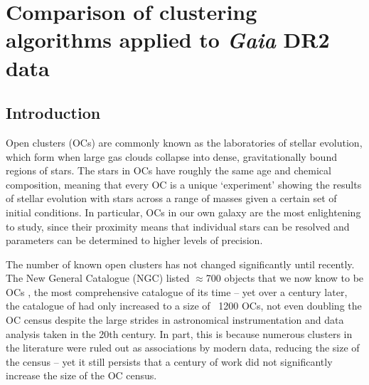 %
\chapter{Comparison of clustering algorithms applied to \emph{Gaia} DR2 data}
\label{sec:comparison}





\section{Introduction}

Open clusters (OCs) are commonly known as the laboratories of stellar evolution, which form when large gas clouds collapse into dense, gravitationally bound regions of stars. The stars in OCs have roughly the same age and chemical composition, meaning that every OC is a unique `experiment' showing the results of stellar evolution with stars across a range of masses given a certain set of initial conditions. In particular, OCs in our own galaxy are the most enlightening to study, since their proximity means that individual stars can be resolved and parameters can be determined to higher levels of precision.

The number of known open clusters has not changed significantly until recently. The New General Catalogue (NGC) listed $\approx$700 objects that we now know to be OCs \citep{dreyer_new_general_1888a}, the most comprehensive catalogue of its time -- yet over a century later, the catalogue of \cite{mermilliod_database_1995} had only increased to a size of ~1200 OCs, not even doubling the OC census despite the large strides in astronomical instrumentation and data analysis taken in the 20th century. In part, this is because numerous clusters in the literature were ruled out as associations by modern data, reducing the size of the census -- yet it still persists that a century of work did not significantly increase the size of the OC census.

